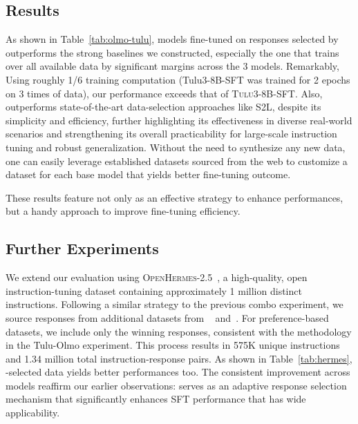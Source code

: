 
\subsection{Results}

As shown in Table~\ref{tab:olmo-tulu}, models fine-tuned on responses selected by \name outperforms the strong baselines we constructed, especially the one that trains over all available data by significant margins across the 3 models. 
Remarkably, Using roughly 1/6 training computation (Tulu3-8B-SFT was trained for 2 epochs on 3 times of data), our performance exceeds that of \textsc{Tulu3-8B-SFT}. 
Also, \name outperforms state-of-the-art data-selection approaches like S2L, despite its simplicity and efficiency, further highlighting its effectiveness in diverse real-world scenarios and strengthening its overall practicability for large-scale instruction tuning and robust generalization.
Without the need to synthesize any new data, one can easily leverage established datasets sourced from the web to customize a dataset for each base model that yields better fine-tuning outcome. 

These results feature \name not only as an effective strategy to enhance performances, but a handy approach to improve fine-tuning efficiency. 

\subsection{Further Experiments}

We extend our evaluation using \textsc{OpenHermes-2.5}~\cite{OpenHermes}, a high-quality, open instruction-tuning dataset containing approximately 1 million distinct instructions. Following a similar strategy to the previous combo experiment, we source responses from additional datasets from ~\citet{open_hermes_preferences} and~\citet{huggingface2024openhermes}. For preference-based datasets, we include only the winning responses, consistent with the methodology in the Tulu-Olmo experiment. This process results in 575K unique instructions and 1.34 million total instruction-response pairs. 
As shown in Table~\ref{tab:hermes}, \name-selected data yields better performances too. 
The consistent improvement across models reaffirm our earlier observations: \name serves as an adaptive response selection mechanism that significantly enhances SFT performance that has wide applicability. 



